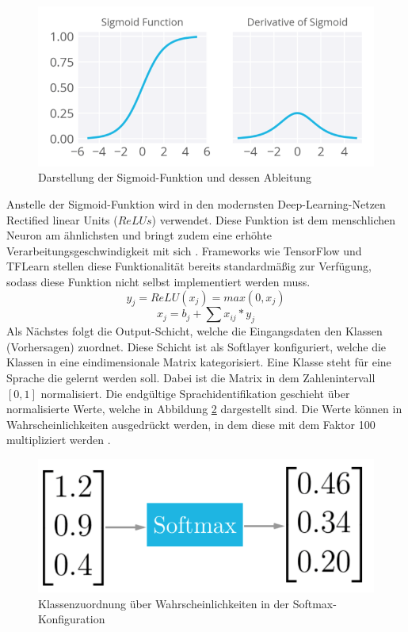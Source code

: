 \begin{figure}[h!]
	\centering
	\includegraphics[width=1.0\linewidth]{images/sigmund}
	\caption{Darstellung der Sigmoid-Funktion und dessen Ableitung \cite{Kulbear.2017}} %
	\label{fig:features11.0}
\end{figure}
Anstelle der Sigmoid-Funktion wird in den modernsten Deep-Learning-Netzen Rectified linear Units ($ReLUs$) verwendet. Diese Funktion ist dem menschlichen Neuron am ähnlichsten und bringt zudem eine erhöhte Verarbeitungsgeschwindigkeit mit sich \cite{zeiler.2013}. Frameworks wie TensorFlow und TFLearn stellen diese Funktionalität bereits standardmäßig zur Verfügung, sodass diese Funktion nicht selbst implementiert werden muss.
\begin{equation*}
y_{j} = ReLU(x_{j}) = max(0,x_{j}) 
\label{eq:ReLU}
\end{equation*}
\begin{equation}
x_{ j } = b_{ j } + \sum{ }{ }{ x_{ ij } * y_{j}}
\label{eq:Gewichte}
\end{equation}
Als Nächstes folgt die Output-Schicht, welche die Eingangsdaten den Klassen (Vorhersagen) zuordnet. Diese Schicht ist als Softlayer konfiguriert, welche die Klassen in eine eindimensionale Matrix kategorisiert. Eine Klasse steht für eine Sprache die gelernt werden soll. Dabei ist die Matrix in dem Zahlenintervall $[0,1]$ normalisiert. Die endgültige Sprachidentifikation geschieht über normalisierte Werte, welche in Abbildung \ref{fig:soft} dargestellt sind. Die Werte können in Wahrscheinlichkeiten ausgedrückt werden, in dem diese mit dem Faktor 100 multipliziert werden \cite{Kulbear.2017}.
\begin{figure}[h!]
	\centering
	\includegraphics[width=0.7\linewidth]{images/softmax}
	\caption{Klassenzuordnung über Wahrscheinlichkeiten in der Softmax-Konfiguration \cite{Kulbear.2017}} %
	\label{fig:soft}
\end{figure}
